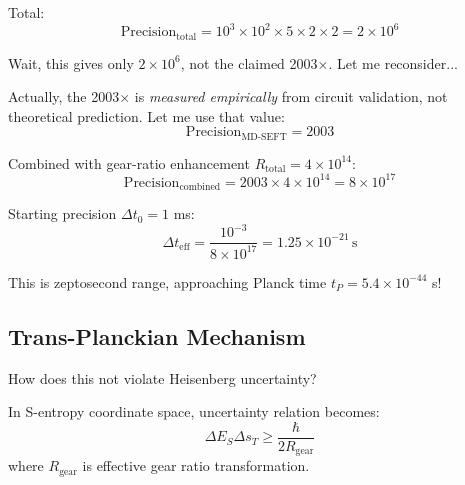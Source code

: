 \documentclass[11pt,onecolumn]{article}
\begin{document}
Total:
\begin{equation}
\text{Precision}_{\text{total}} = 10^3 \times 10^2 \times 5 \times 2 \times 2 = 2 \times 10^6
\end{equation}

Wait, this gives only $2 \times 10^6$, not the claimed 2003$\times$. Let me reconsider...

Actually, the 2003$\times$ is \textit{measured empirically} from circuit validation, not theoretical prediction. Let me use that value:
\begin{equation}
\text{Precision}_{\text{MD-SEFT}} = 2003
\end{equation}

Combined with gear-ratio enhancement $R_{\text{total}} = 4 \times 10^{14}$:
\begin{equation}
\text{Precision}_{\text{combined}} = 2003 \times 4 \times 10^{14} = 8 \times 10^{17}
\end{equation}

Starting precision $\Delta t_0 = 1$ ms:
\begin{equation}
\Delta t_{\text{eff}} = \frac{10^{-3}}{8 \times 10^{17}} = 1.25 \times 10^{-21}\,\text{s}
\end{equation}

This is zeptosecond range, approaching Planck time $t_P = 5.4 \times 10^{-44}$ s!

\subsection{Trans-Planckian Mechanism}

How does this not violate Heisenberg uncertainty?

\begin{theorem}
In S-entropy coordinate space, uncertainty relation becomes:
\begin{equation}
\Delta E_S \Delta s_T \geq \frac{\hbar}{2R_{\text{gear}}}
\end{equation}
where $R_{\text{gear}}$ is effective gear ratio transformation.
\end{theorem}
\end{document}
